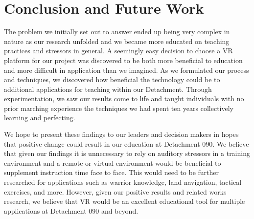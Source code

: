 \documentclass[manuscript,screen,review]{acmart}
\begin{document}
\section{Conclusion and Future Work}
The problem we initially set out to answer ended up being very complex in nature as our research unfolded 
and we became more educated on teaching practices and stressors in general. A seemingly easy decision to 
choose a VR platform for our project was discovered to be both more beneficial to education and more 
difficult in application than we imagined. As we formulated our process and techniques, we discovered 
how beneficial the technology could be to additional applications for teaching within our Detachment. 
Through experimentation, we saw our results come to life and taught individuals with no prior marching 
experience the techniques we had spent ten years collectively learning and perfecting.  

We hope to present these findings to our leaders and decision makers in hopes that positive change 
could result in our education at Detachment 090. We believe that given our findings it is unnecessary 
to rely on auditory stressors in a training environment and a remote or virtual environment would be 
beneficial to supplement instruction time face to face. This would need to be further researched for 
applications such as warrior knowledge, land navigation, tactical exercises, and more. However, given 
our positive results and related works research, we believe that VR would be an excellent educational 
tool for multiple applications at Detachment 090 and beyond.\\ \\ \\ \\ \\ \\ \\
\end{document}
